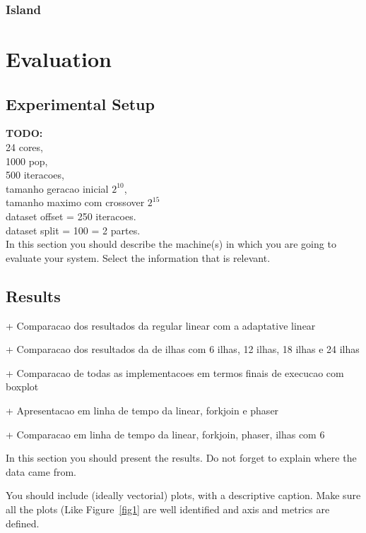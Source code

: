\documentclass[runningheads]{llncs}
\begin{document}
\subsubsection{Island}

\section{Evaluation}

\subsection{Experimental Setup}
\textbf{TODO:} \\
24 cores, \\ 1000 pop,\\  500 iteracoes, \\ 
tamanho geracao inicial \(2^{10}\), \\ 
tamanho maximo com crossover \(2^{15}\) \\
dataset offset = 250 iteracoes. \\
dataset split = 100 = 2 partes. \\

In this section you should describe the machine(s) in which you are going to evaluate your system. Select the information that is relevant.


\subsection{Results}

+ Comparacao dos resultados da regular linear com a adaptative linear

+ Comparacao dos resultados da de ilhas com 6 ilhas, 12 ilhas, 18 ilhas e 24 ilhas

+ Comparacao de todas as implementacoes em termos finais de execucao com boxplot

+ Apresentacao em linha de tempo da linear, forkjoin e phaser

+ Comparacao em linha de tempo da linear, forkjoin, phaser, ilhas com 6

In this section you should present the results. Do not forget to explain where the data came from. 

You should include (ideally vectorial) plots, with a descriptive caption. Make sure all the plots (Like Figure~\ref{fig1} are well identified and axis and metrics are defined.

\end{document}
